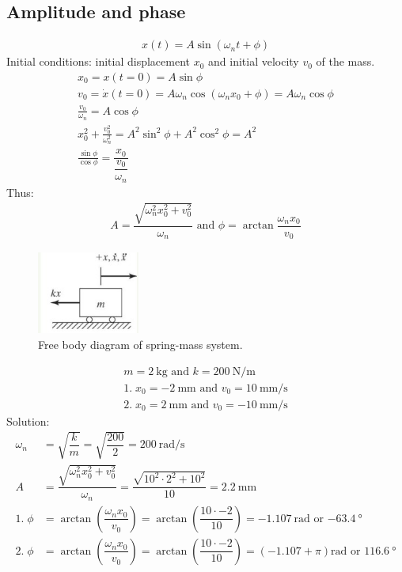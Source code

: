 \documentclass[class=report, crop=false, 12pt,a4paper]{standalone}
\begin{document}
\subsection{Amplitude and phase}
\begin{gather}
    x(t) = A \sin\left(\omega_n t + \phi\right)
\end{gather}
Initial conditions: initial displacement $x_0$ and initial velocity $v_0$ of the mass. 
\begin{gather}
    x_0 = x(t = 0) = A\sin \phi\\
    v_0 = \dot{x} (t=0) = A\omega_n \cos\left(\omega_n x_0 + \phi\right) = A \omega_n \cos \phi\\
    \frac{v_0}{\omega_n} = A \cos \phi\\
    x_0^2 + \frac{v_0^2}{\omega_n^2} = A^2 \sin^2 \phi + A^2 \cos^2 \phi = A^2\\
    \frac{\sin \phi}{\cos \phi} = \dfrac{x_0}{\dfrac{v_0}{\omega_n}}
\end{gather}
Thus:
\begin{gather}
    A = \dfrac{\sqrt{\omega_n^2 x_0^2 + v_0^2}}{\omega_n} \textrm{ and } \phi = \arctan{\dfrac{\omega_n x_0}{v_0}}
\end{gather}
\begin{figure}[H]
    \centering
    \includegraphics[width = 0.3\textwidth]{../img/diagram2.jpg}
    \caption{Free body diagram of spring-mass system.}
\end{figure}
\begin{gather}
    m = \SI{2}{\kg} \textrm{ and } k = \SI{200}{\newton\per\meter}\\
    1. \; x_0 = \SI{-2}{\milli\meter} \textrm{ and } v_0 = \SI{10}{\milli\meter\per\second}\\
    2. \; x_0 = \SI{2}{\milli\meter} \textrm{ and } v_0 = \SI{-10}{\milli\meter\per\second}
\end{gather}
Solution:
\begin{align}
    \omega_n &= \sqrt{\dfrac{k}{m}} = \sqrt{\dfrac{200}{2}} = \SI{200}{\radian\per\second}\\
    A &= \dfrac{\sqrt{\omega_n^2 x_0^2 + v_0^2}}{\omega_n} = \dfrac{\sqrt{10^2 \cdot 2^2 + 10^2}}{10} = \SI{2.2}{\milli\meter}\\
    1. \; \phi &= \arctan\left(\dfrac{\omega_n x_0}{v_0}\right) = \arctan\left(\dfrac{10\cdot-2}{10}\right) = \SI{-1.107}{\radian} \textrm{ or } \SI{-63.4}{\degree}\\
    2. \; \phi &= \arctan\left(\dfrac{\omega_n x_0}{v_0}\right) = \arctan\left(\dfrac{10\cdot-2}{10}\right) = \left(-1.107+\pi\right)\si{\radian} \textrm{ or } \SI{116.6}{\degree}
\end{align}
\end{document}
